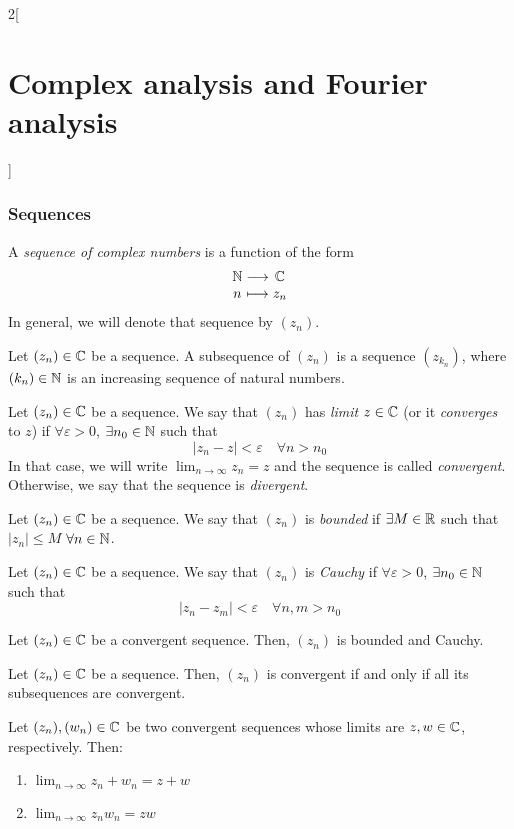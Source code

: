 \documentclass[../../../main.tex]{subfiles}
\begin{document}
\begin{multicols}{2}[\section{Complex analysis and Fourier analysis}]
  \subsubsection{Sequences}
  \begin{definition}
    A \textit{sequence of complex numbers} is a function of the form $$\function{}{\NN}{\CC}{n}{z_n}$$ In general, we will denote that sequence by $(z_n)$.
  \end{definition}
  \begin{definition}
    Let $(z_n)\in\mathbb{C}$ be a sequence. A subsequence of $(z_n)$ is a sequence $(z_{k_n})$, where $(k_n)\in\mathbb{N}$ is an increasing sequence of natural numbers.
  \end{definition}
  \begin{definition}
    Let $(z_n)\in\mathbb{C}$ be a sequence. We say that $(z_n)$ has \emph{limit} $z\in\mathbb{C}$ (or it \textit{converges} to $z$) if $\forall\varepsilon>0$, $\exists n_0\in\mathbb{N}$ such that $$|z_n - z| < \varepsilon\quad \forall n > n_0$$ In that case, we will write $\displaystyle\lim_{n \to \infty} z_n = z$ and the sequence is called \emph{convergent}. Otherwise, we say that the sequence is \emph{divergent}.
  \end{definition}
  \begin{definition}
    Let $(z_n)\in\mathbb{C}$ be a sequence. We say that $(z_n)$ is \emph{bounded} if $\exists M\in\mathbb{R}$ such that $|z_n|\leq M$ $\forall n\in\mathbb{N}$.
  \end{definition}
  \begin{definition}
    Let $(z_n)\in\mathbb{C}$ be a sequence. We say that $(z_n)$ is \emph{Cauchy} if $\forall\varepsilon>0$, $\exists n_0\in\mathbb{N}$ such that $$|z_n - z_m| < \varepsilon\quad \forall n,m > n_0$$
  \end{definition}
  \begin{prop}
    Let $(z_n)\in\mathbb{C}$ be a convergent sequence. Then, $(z_n)$ is bounded and Cauchy.
  \end{prop}
  \begin{prop}
    Let $(z_n)\in\mathbb{C}$ be a sequence. Then, $(z_n)$ is convergent if and only if all its subsequences are convergent.
  \end{prop}
  \begin{prop}
    Let $(z_n),(w_n)\in\mathbb{C}$ be two convergent sequences whose limits are $z,w\in \mathbb{C}$, respectively. Then:
    \begin{enumerate}
      \item $\displaystyle\lim_{n\to\infty}z_n+w_n=z+w$
      \item $\displaystyle\lim_{n\to\infty}z_nw_n=zw$

\end{enumerate}
\end{prop}
\end{multicols}
\end{document}
